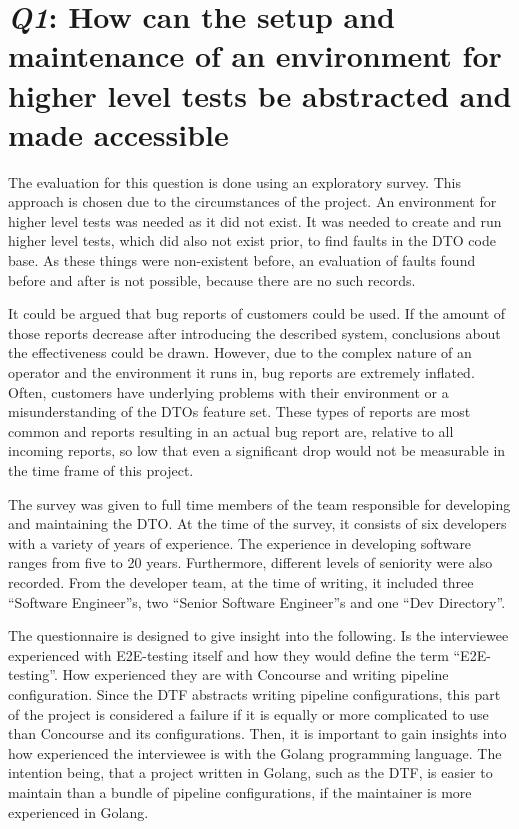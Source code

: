 \section{\textit{Q1}: How can the setup and maintenance of an environment for higher level tests be abstracted and made accessible}\label{sec:textit{q1}:-how-can-the-setup-and-maintenance-of-an-environment-for-higher-level-tests-be-abstracted-and-made-accessible?}

The evaluation for this question is done using an exploratory survey.
This approach is chosen due to the circumstances of the project.
An environment for higher level tests was needed as it did not exist.
It was needed to create and run higher level tests, which did also not exist prior, to find faults in the DTO code base.
As these things were non-existent before, an evaluation of faults found before and after is not possible, because there are no such records.

It could be argued that bug reports of customers could be used.
If the amount of those reports decrease after introducing the described system, conclusions about the effectiveness could be drawn.
However, due to the complex nature of an operator and the environment it runs in, bug reports are extremely inflated.
Often, customers have underlying problems with their environment or a misunderstanding of the DTOs feature set.
These types of reports are most common and reports resulting in an actual bug report are, relative to all incoming reports, so low that even a significant drop would not be measurable in the time frame of this project.

\pagebreak

The survey was given to full time members of the team responsible for developing and maintaining the DTO.
At the time of the survey, it consists of six developers with a variety of years of experience.
The experience in developing software ranges from five to 20 years.
Furthermore, different levels of seniority were also recorded.
From the developer team, at the time of writing, it included three ``Software Engineer''s, two ``Senior Software Engineer''s and one ``Dev Directory''.

The questionnaire is designed to give insight into the following.
Is the interviewee experienced with E2E-testing itself and how they would define the term ``E2E-testing''.
How experienced they are with Concourse and writing pipeline configuration.
Since the DTF abstracts writing pipeline configurations, this part of the project is considered a failure if it is equally or more complicated to use than Concourse and its configurations.
Then, it is important to gain insights into how experienced the interviewee is with the Golang programming language.
The intention being, that a project written in Golang, such as the DTF, is easier to maintain than a bundle of pipeline configurations, if the maintainer is more experienced in Golang.

